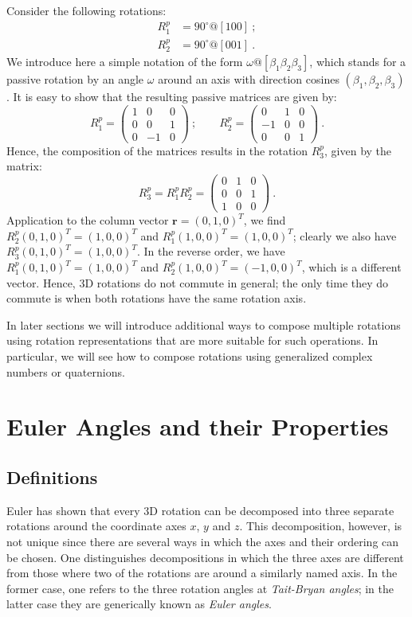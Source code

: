 \begin{example}
Consider the following rotations:
\begin{align*}
	R^p_1 &= 90^{\circ}@[100]\ ;\\
	R^p_2 &= 90^{\circ}@[001]\ .	
\end{align*}
We introduce here a simple notation of the form $\omega @[\beta_1\beta_2\beta_3]$, which stands for a passive rotation by an angle $\omega$ around an axis with direction cosines $(\beta_1,\beta_2,\beta_3)$.  It is easy to show that the resulting passive matrices are given by:
\[
	R^p_1 = \left(\begin{array}{ccc}
	1 & 0 & 0\\
	0 & 0 & 1\\
	0 & -1 & 0\end{array}\right)\ ; \qquad
	R^p_2 = \left(\begin{array}{ccc}
	0 & 1 & 0\\
	-1 & 0 & 0\\
	0 & 0 & 1\end{array}\right)\ .
\]
Hence, the composition of the matrices results in the rotation $R^p_3$, given by the matrix:
\[
	R^p_3 = R^p_1 R^p_2 = \left(\begin{array}{ccc}
	0 & 1 & 0\\
	0 & 0 & 1\\
	1 & 0 & 0\end{array}\right)\ .
\]
Application to the column vector $\mathbf{r}=(0,1,0)^T$, we find $R^p_2(0,1,0)^T = (1,0,0)^T$ and $R^p_1(1,0,0)^T = (1,0,0)^T$; clearly we also have $R^p_3(0,1,0)^T=(1,0,0)^T$. In the reverse order, we have $R^p_1(0,1,0)^T = (1,0,0)^T$ and $R^p_2(1,0,0)^T=(-1,0,0)^T$, which is a different vector.  Hence, 3D rotations do not commute in general; the only time they do commute is when both rotations have the same rotation axis.
\end{example}

In later sections we will introduce additional ways to compose multiple rotations using rotation representations  that are more suitable for such operations.  In particular, we will see how to compose rotations using generalized complex numbers or quaternions.


\section{Euler Angles and their Properties\label{sec:eulerangles}}

\subsection{Definitions}
Euler has shown that every 3D rotation can be decomposed into three separate rotations around the coordinate axes $x$, $y$ and $z$. This decomposition, however, is not unique since there are several ways in which the axes and their ordering can be chosen.  One distinguishes decompositions in which the three axes are different from those where two of the rotations are around a similarly named axis.  In the former case, one refers to the three rotation angles at \textit{Tait-Bryan angles}; in the latter case they are generically known as \textit{Euler angles}.  

